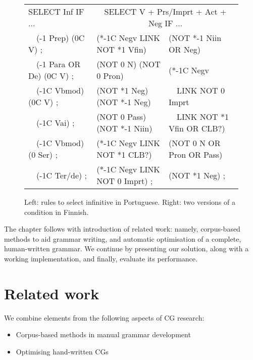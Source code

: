 \begin{figure}[t]
\ttfamily
\centering
\begin{tabular}{l | l  l}
SELECT Inf IF ... & \multicolumn{2}{c}{SELECT V + Prs/Imprt + Act + Neg IF ...} \\
~~(-1 Prep) (0C V) ;       & (*-1C Negv LINK NOT *1 Vfin)  & (NOT *-1 Niin OR Neg)  \\
~~(-1 Para OR De) (0C V) ; & (NOT 0 N) (NOT 0 Pron)        & (*-1C Negv \\
~~(-1C Vbmod) (0C V) ;     & (NOT *1 Neg) (NOT *-1 Neg)    &  ~~LINK NOT 0 Imprt \\
~~(-1C Vai) ;              & (NOT 0 Pass) (NOT *-1 Niin)   &  ~~LINK NOT *1 Vfin OR CLB?) \\
~~(-1C Vbmod) (0 Ser) ;    & (*-1C Negv LINK NOT *1 CLB?)  & (NOT 0 N OR Pron OR Pass) \\
~~(-1C Ter/de) ;           & (*-1C Negv LINK NOT 0 Imprt) ;  & (NOT *1 Neg) ; \\

\end{tabular}

\caption{Left: rules to select infinitive in Portuguese. 
        Right: two versions of a condition in Finnish.}

\label{fig:infrules}
\end{figure}

The chapter follows with introduction of related work: namely, corpus-based methods to aid grammar writing, and automatic optimisation of a complete, human-written grammar. We continue by presenting our solution, along with a working implementation, and finally, evaluate its performance.



\section{Related work}
\label{sec:CGanaRelated}

We combine elements from the following aspects of CG research:

\begin{itemize}
\item Corpus-based methods in manual grammar development \cite{voutilainen2004}
\item Optimising hand-written CGs~\cite{bick2013tuning}
\end{itemize}

